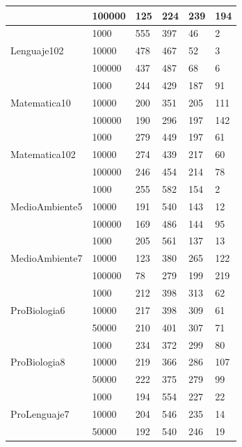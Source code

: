 \begin{longtable}{|p{3cm}|p{3cm}|p{2cm}|p{2cm}|p{2cm}|p{2cm}|}
\cline{2-6}      & 100000 & 125   & 224   & 239   & 194 \\
\hline
\multirow{3}[6]{*}{Lenguaje102} & 1000  & 555   & 397   & 46    & 2 \\
\cline{2-6}      & 10000 & 478   & 467   & 52    & 3 \\
\cline{2-6}      & 100000 & 437   & 487   & 68    & 6 \\
\hline
\multirow{3}[6]{*}{Matematica10} & 1000  & 244   & 429   & 187   & 91 \\
\cline{2-6}      & 10000 & 200   & 351   & 205   & 111 \\
\cline{2-6}      & 100000 & 190   & 296   & 197   & 142 \\
\hline
\multirow{3}[6]{*}{Matematica102} & 1000  & 279   & 449   & 197   & 61 \\
\cline{2-6}      & 10000 & 274   & 439   & 217   & 60 \\
\cline{2-6}      & 100000 & 246   & 454   & 214   & 78 \\
\hline
\multirow{3}[6]{*}{MedioAmbiente5} & 1000  & 255   & 582   & 154   & 2 \\
\cline{2-6}      & 10000 & 191   & 540   & 143   & 12 \\
\cline{2-6}      & 100000 & 169   & 486   & 144   & 95 \\
\hline
\multirow{3}[6]{*}{MedioAmbiente7} & 1000  & 205   & 561   & 137   & 13 \\
\cline{2-6}      & 10000 & 123   & 380   & 265   & 122 \\
\cline{2-6}      & 100000 & 78    & 279   & 199   & 219 \\
\hline
\multirow{3}[6]{*}{ProBiologia6} & 1000  & 212   & 398   & 313   & 62 \\
\cline{2-6}      & 10000 & 217   & 398   & 309   & 61 \\
\cline{2-6}      & 50000 & 210   & 401   & 307   & 71 \\
\hline
\multirow{3}[6]{*}{ProBiologia8} & 1000  & 234   & 372   & 299   & 80 \\
\cline{2-6}      & 10000 & 219   & 366   & 286   & 107 \\
\cline{2-6}      & 50000 & 222   & 375   & 279   & 99 \\
\hline
\multirow{3}[6]{*}{ProLenguaje7} & 1000  & 194   & 554   & 227   & 22 \\
\cline{2-6}      & 10000 & 204   & 546   & 235   & 14 \\
\cline{2-6}      & 50000 & 192   & 540   & 246   & 19 \\

\end{longtable}
